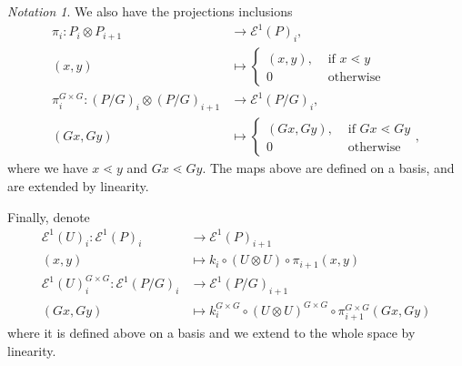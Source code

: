 \documentclass[10 pt]{amsart}
\theoremstyle{plain}
\theoremstyle{definition}
\theoremstyle{remark}
\newtheorem{note}[thm]{Notation}
\numberwithin{equation}{section}
\begin{document}
\begin{note}
We also have the projections inclusions
\begin{align*}
	\pi_i:P_i \otimes P_{i+1} & \rightarrow \mathcal E^1(P)_{i},\\
	(x, y) &\mapsto  \begin{cases}
	(x, y), &\text{ if }x\lessdot y\\
	0 &\text { otherwise}
\end{cases}\\
	\pi_i^{G\times G}: (P/G)_i \otimes (P/G)_{i+1} &\rightarrow\mathcal E^1(P/G)_i,\\
	(Gx, Gy) &\mapsto \begin{cases}
	(Gx, Gy), &\text{ if }Gx\lessdot Gy\\
	0 &\text { otherwise}
\end{cases},
\end{align*}
where we have $x \lessdot y$ and $Gx \lessdot Gy.$ The maps above are defined on a basis, and are extended by linearity.

Finally, denote
\begin{align*}
	\mathcal E^1(U)_i:\mathcal E^1(P)_i &\rightarrow \mathcal E^1(P)_{i+1}\\
	(x, y) &\mapsto k_i \circ (U \otimes U) \circ \pi_{i+1}(x, y)\\
\mathcal E^1(U)^{G\times G}_i:\mathcal E^1(P/G)_i & \rightarrow \mathcal E^1(P/G)_{i+1}\\
	(Gx, Gy) &\mapsto k^{G\times G}_i \circ (U \otimes U)^{G\times G} \circ \pi^{G\times G}_{i+1}(Gx, Gy)
\end{align*}
where it is defined above on a basis and we extend to the whole space by linearity.
\end{note}
\end{document}
